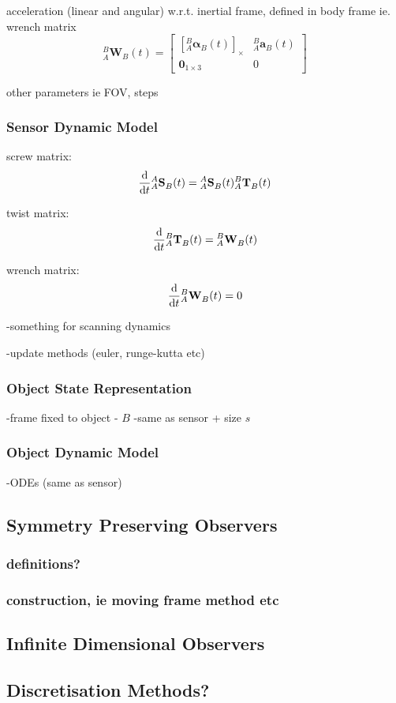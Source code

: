 		acceleration (linear and angular) w.r.t. inertial frame, defined in body frame ie. wrench matrix
		\begin{equation}
				{^{B}_{A}\mathbf{W}^{}_{B}(t)} = 
				\begin{bmatrix}
				  {[^{B}_{A}\mathbf{\alpha}^{}_{B}(t)]_\times} 	& 	^{B}_{A}\mathbf{a}^{}_{B}(t)\\
				  \textbf{0}_{1 \times 3} & 0						  
				\end{bmatrix}
		\end{equation}
		
		other parameters ie FOV, steps
				
	\subsubsection{Sensor Dynamic Model}
		screw matrix:
		\begin{equation}
			{\frac{\textnormal{d}}{\textnormal{d}t}} {^{A}_{A}\mathbf{S}^{}_{B}(t)} ={^{A}_{A}\mathbf{S}^{}_{B}(t)} {^{B}_{A}\mathbf{T}^{}_{B}(t)}
		\end{equation}		
		
		twist matrix:
		\begin{equation}
			{\frac{\textnormal{d}}{\textnormal{d}t}} {^{B}_{A}\mathbf{T}^{}_{B}(t)} = {^{B}_{A}\mathbf{W}^{}_{B}(t)}
		\end{equation}		
		
		wrench matrix:
		\begin{equation}
			{\frac{\textnormal{d}}{\textnormal{d}t}} {^{B}_{A}\mathbf{W}^{}_{B}(t)}=0			
		\end{equation}
		
		-something for scanning dynamics
		
		-update methods (euler, runge-kutta etc)
		
	\subsubsection{Object State Representation}
		-frame fixed to object - $B$
		-same as sensor + size $s$
	\subsubsection{Object Dynamic Model}
		-ODEs (same as sensor)
		
\subsection{Symmetry Preserving Observers}
	\subsubsection{definitions?}
	\subsubsection{construction, ie moving frame method etc}
\subsection{Infinite Dimensional Observers}
\subsection{Discretisation Methods?}